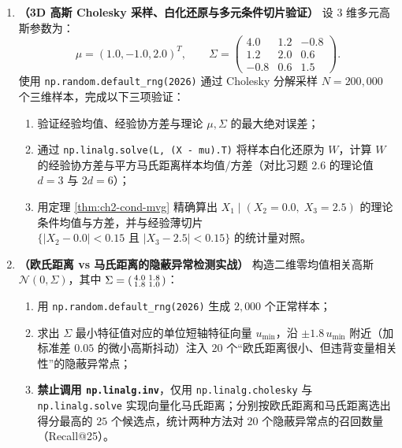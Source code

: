 \begin{enumerate}[label=\textbf{2.\arabic*}, leftmargin=2.4em, resume]
  \item \textbf{（3D 高斯 Cholesky 采样、白化还原与多元条件切片验证）} 设 3 维多元高斯参数为：
  \[
    \mu = (1.0, -1.0, 2.0)^T, \qquad
    \Sigma = \begin{pmatrix} 4.0 & 1.2 & -0.8 \\ 1.2 & 2.0 & 0.6 \\ -0.8 & 0.6 & 1.5 \end{pmatrix}.
  \]
  使用 \texttt{np.random.default\_rng(2026)} 通过 Cholesky 分解采样 $N = 200{,}000$ 个三维样本，完成以下三项验证：
  \begin{enumerate}[label=(\arabic*), leftmargin=1.8em]
    \item 验证经验均值、经验协方差与理论 $\mu, \Sigma$ 的最大绝对误差；
    \item 通过 \texttt{np.linalg.solve(L, (X - mu).T)} 将样本白化还原为 $W$，计算 $W$ 的经验协方差与平方马氏距离样本均值/方差（对比习题 2.6 的理论值 $d=3$ 与 $2d=6$）；
    \item 用定理 \ref{thm:ch2-cond-mvg} 精确算出 $X_1 \mid (X_2 = 0.0,\; X_3 = 2.5)$ 的理论条件均值与方差，并与经验薄切片 $\{|X_2 - 0.0|<0.15 \text{ 且 } |X_3 - 2.5|<0.15\}$ 的统计量对照。
  \end{enumerate}
  \par\smallskip{}

  \item \textbf{（欧氏距离 vs 马氏距离的隐蔽异常检测实战）} 构造二维零均值相关高斯 $\mathcal{N}(0, \Sigma)$，其中 $\Sigma = \begin{psmallmatrix} 4.0 & 1.8 \\ 1.8 & 1.0 \end{psmallmatrix}$：
  \begin{enumerate}[label=(\arabic*), leftmargin=1.8em]
    \item 用 \texttt{np.random.default\_rng(2026)} 生成 $2{,}000$ 个正常样本；
    \item 求出 $\Sigma$ 最小特征值对应的单位短轴特征向量 $u_{\min}$，沿 $\pm 1.8\,u_{\min}$ 附近（加标准差 $0.05$ 的微小高斯抖动）注入 $20$ 个“欧氏距离很小、但违背变量相关性”的隐蔽异常点；
    \item \textbf{禁止调用 \texttt{np.linalg.inv}}，仅用 \texttt{np.linalg.cholesky} 与 \texttt{np.linalg.solve} 实现向量化马氏距离；分别按欧氏距离和马氏距离选出得分最高的 $25$ 个候选点，统计两种方法对 $20$ 个隐蔽异常点的召回数量（Recall@25）。
  \end{enumerate}
  \par\smallskip{}
\end{enumerate}
